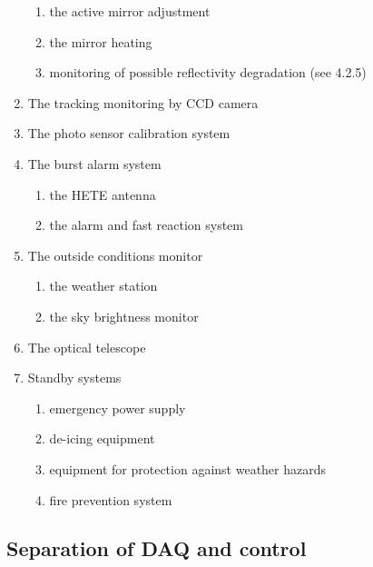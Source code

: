 \begin{enumerate}
\begin{enumerate}
\item  the active mirror adjustment

\item  the mirror heating

\item  monitoring of possible reflectivity degradation (see 4.2.5)
\end{enumerate}

\item  The tracking monitoring by CCD camera

\item  The photo sensor calibration system

\item  The burst alarm system

\begin{enumerate}
\item  the HETE antenna

\item  the alarm and fast reaction system
\end{enumerate}

\item  The outside conditions monitor

\begin{enumerate}
\item  the weather station

\item  the sky brightness monitor
\end{enumerate}

\item  The optical telescope

\item  Standby systems

\begin{enumerate}
\item  emergency power supply

\item  de-icing equipment

\item  equipment for protection against weather hazards

\item  fire prevention system
\end{enumerate}
\end{enumerate}

\subsection{Separation of DAQ and control}

